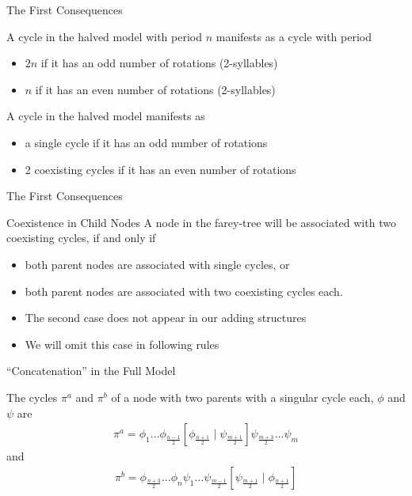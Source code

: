 \begin{frame}{The First Consequences}
	\begin{theorem}
		A cycle in the halved model with period $n$ manifests as a cycle with period
		\begin{itemize}
			\item $2n$ if it has an odd number of rotations (2-syllables)
			\item $n$ if it has an even number of rotations (2-syllables)
		\end{itemize}
	\end{theorem}
	\pause
	\begin{theorem}
		A cycle in the halved model manifests as
		\begin{itemize}
			\item a single cycle if it has an odd number of rotations
			\item 2 coexisting cycles if it has an even number of rotations
		\end{itemize}
	\end{theorem}
\end{frame}

\begin{frame}{The First Consequences}
	\begin{theorem}{Coexistence in Child Nodes}
		A node in the farey-tree will be associated with two coexisting cycles, if and only if
		\begin{itemize}
			\pause
			\item both parent nodes are associated with single cycles, or \pause
			\item both parent nodes are associated with two coexisting cycles each.
		\end{itemize}
	\end{theorem}
	\begin{itemize}
		\pause
		\item The second case does not appear in our adding structures
		\item We will omit this case in following rules
	\end{itemize}
\end{frame}

\begin{frame}{``Concatenation'' in the Full Model}
	\begin{theorem}
		The cycles $\pi^a$ and $\pi^b$ of a node with two parents with a singular cycle each, $\phi$ and $\psi$ are
		\begin{align*}
			\pi^a = \phi_1 \dots \phi_{\frac{n-1}{2}} \left[\phi_{\frac{n+1}{2}} \mid \psi_{\frac{m+1}{2}}\right] \psi_{\frac{m+3}{2}} \dots \psi_m
		\end{align*}
		and
		\begin{align*}
			\pi^b =  \phi_{\frac{n+3}{2}} \dots \phi_n \psi_1 \dots \psi_{\frac{m-1}{2}} \left[\psi_{\frac{m+1}{2}} \mid \phi_{\frac{n+1}{2}}\right]
		\end{align*}
	\end{theorem}
\end{frame}

